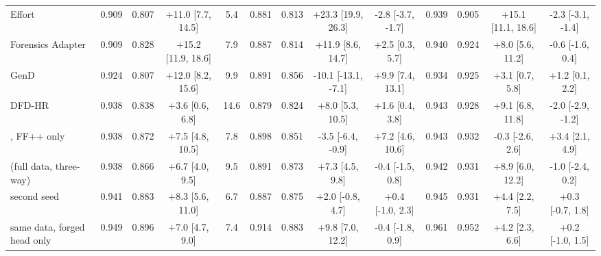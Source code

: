\begin{tabular}{@{}l cccc cccc cccc@{}}
Effort~\cite{effort} & 0.909 & 0.807 & +11.0 [7.7, 14.5] & 5.4 & 0.881 & 0.813 & +23.3 [19.9, 26.3] & -2.8 [-3.7, -1.7] & 0.939 & 0.905 & +15.1 [11.1, 18.6] & -2.3 [-3.1, -1.4] \\
Forensics Adapter~\cite{forensicsadapter} & 0.909 & 0.828 & +15.2 [11.9, 18.6] & 7.9 & 0.887 & 0.814 & +11.9 [8.6, 14.7] & +2.5 [0.3, 5.7] & 0.940 & 0.924 & +8.0 [5.6, 11.2] & -0.6 [-1.6, 0.4] \\
GenD~\cite{gend2026} & 0.924 & 0.807 & +12.0 [8.2, 15.6] & 9.9 & 0.891 & 0.856 & -10.1 [-13.1, -7.1] & +9.9 [7.4, 13.1] & 0.934 & 0.925 & +3.1 [0.7, 5.8] & +1.2 [0.1, 2.2] \\
DFD-HR~\cite{dfdhr2026} & 0.938 & 0.838 & +3.6 [0.6, 6.8] & 14.6 & 0.879 & 0.824 & +8.0 [5.3, 10.5] & +1.6 [0.4, 3.8] & 0.943 & 0.928 & +9.1 [6.8, 11.8] & -2.0 [-2.9, -1.2] \\
\midrule
\ours{}, FF++ only & 0.938 & 0.872 & +7.5 [4.8, 10.5] & 7.8 & 0.898 & 0.851 & -3.5 [-6.4, -0.9] & +7.2 [4.6, 10.6] & 0.943 & 0.932 & -0.3 [-2.6, 2.6] & +3.4 [2.1, 4.9] \\
\ours{} (full data, three-way) & 0.938 & 0.866 & +6.7 [4.0, 9.5] & 9.5 & 0.891 & 0.873 & +7.3 [4.5, 9.8] & -0.4 [-1.5, 0.8] & 0.942 & 0.931 & +8.9 [6.0, 12.2] & -1.0 [-2.4, 0.2] \\
\quad second seed & 0.941 & 0.883 & +8.3 [5.6, 11.0] & 6.7 & 0.887 & 0.875 & +2.0 [-0.8, 4.7] & +0.4 [-1.0, 2.3] & 0.945 & 0.931 & +4.4 [2.2, 7.5] & +0.3 [-0.7, 1.8] \\
same data, forged head only & 0.949 & 0.896 & +7.0 [4.7, 9.0] & 7.4 & 0.914 & 0.883 & +9.8 [7.0, 12.2] & -0.4 [-1.8, 0.9] & 0.961 & 0.952 & +4.2 [2.3, 6.6] & +0.2 [-1.0, 1.5] \\
\bottomrule
\end{tabular}
